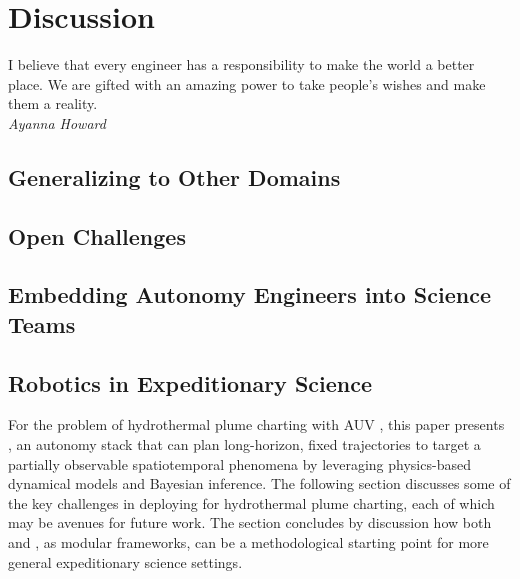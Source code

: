 \chapter{Discussion}

\begin{center}
    \begin{minipage}{0.7\textwidth}
      \begin{small}
        I believe that every engineer has a responsibility to make the world a better place. We are gifted with an amazing power to take people’s wishes and make them a reality.\\ \emph{Ayanna Howard}
      \end{small}
    \end{minipage}
    \vspace{0.5cm}
\end{center}


\section{Generalizing to Other Domains}

\section{Open Challenges}

\section{Embedding Autonomy Engineers into Science Teams}

\section{Robotics in Expeditionary Science}

\label{sec:discussion}

For the problem of hydrothermal plume charting with AUV \Sentry, this paper presents \PHORTEX, an autonomy stack that can plan long-horizon, fixed trajectories to target a partially observable spatiotemporal phenomena by leveraging physics-based dynamical models and Bayesian inference. The following section discusses some of the key challenges in deploying \PHORTEX for hydrothermal plume charting, each of which may be avenues for future work. The section concludes by discussion how both \PHORTEX and \PHUMES, as modular frameworks, can be a methodological starting point for more general expeditionary science settings.

